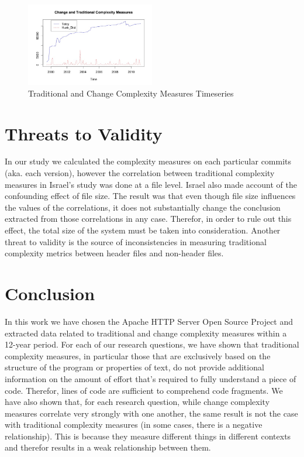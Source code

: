 \documentclass[9pt,twocolumn,a4paper]{article}
\begin{document}
\begin{figure}[h!]
  \centering
  \includegraphics[width=0.5\textwidth]{ChangeandTradPlot}
   \caption{Traditional and Change Complexity Measures Timeseries }
   \label{fig:TandCCT}
\end{figure}

\section{Threats to Validity}
In our study we calculated the complexity measures on each particular commits (aka. each version), however the correlation between traditional complexity measures in Israel's study \cite{Israel} was done at a file level. Israel also made account of the confounding effect of file size. The result was that even though file size influences the values of the correlations, it does not substantially change the conclusion extracted from those correlations in any case. Therefor, in order to rule out this effect, the total size of the system must be taken into consideration. Another threat to validity is the source of inconsistencies in measuring traditional complexity metrics between header files and non-header files.
\section{Conclusion}

In this work we have chosen the Apache HTTP Server Open Source Project and extracted data related to traditional and change complexity measures within a 12-year period. For each of our research questions, we have shown that
traditional complexity measures, in particular those that are exclusively based on the structure of the program or properties of text, do not provide additional information on the amount of effort that's required to fully understand a piece of code. Therefor, lines of code are sufficient to comprehend code fragments. We have also shown that, for each research question, while change complexity measures correlate very strongly with one another, the same result is not the case with traditional complexity measures (in some cases, there is a negative relationship). This is because they measure different things in different contexts and therefor results in a weak relationship between them.
\end{document}
